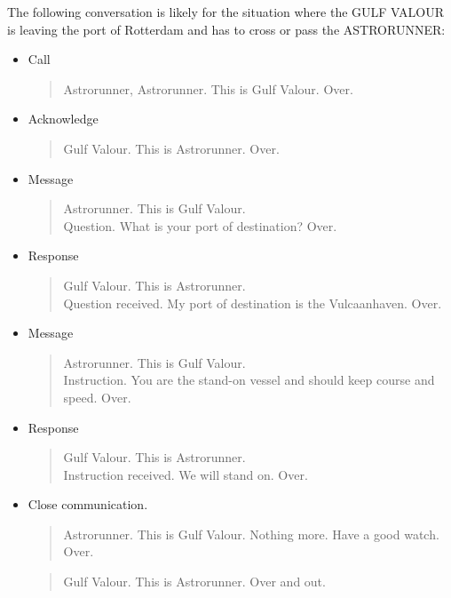 The following conversation is likely for the situation where the GULF VALOUR is leaving the port of Rotterdam and has to cross or pass the ASTRORUNNER:
\begin{spacing}{1}
	\begin{itemize}
		\item Call
		\begin{quote}
			Astrorunner, Astrorunner. This is Gulf Valour. Over.
		\end{quote}
		\item Acknowledge
		\begin{quote}
			Gulf Valour. This is Astrorunner. Over.
		\end{quote}
		\item Message
		\begin{quote}
			Astrorunner. This is Gulf Valour. \\
			Question. What is your port of destination? Over.
		\end{quote}
		\item Response
		\begin{quote}
			Gulf Valour. This is Astrorunner. \\
			Question received. My port of destination is the Vulcaanhaven. Over.
		\end{quote}
		\item Message
		\begin{quote}
			Astrorunner. This is Gulf Valour. \\
			Instruction. You are the stand-on vessel and should keep course and speed. Over.
		\end{quote}
		\item Response
		\begin{quote}
			Gulf Valour. This is Astrorunner. \\
			Instruction received. We will stand on. Over.
		\end{quote}
		\item Close communication.
		\begin{quote}
			Astrorunner. This is Gulf Valour.
			Nothing more. Have a good watch. Over.
		\end{quote}
		\begin{quote}
			Gulf Valour. This is Astrorunner. Over and out.
		\end{quote}
	\end{itemize}
\end{spacing}


